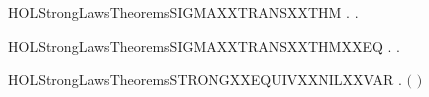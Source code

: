 \begin{SaveVerbatim}{HOLStrongLawsTheoremsSIGMAXXTRANSXXTHM}
\HOLTokenTurnstile{} \HOLSymConst{\HOLTokenForall{}}   .    \HOLTokenTransBegin{}\HOLTokenTransEnd {} \HOLSymConst{\HOLTokenImp{}} \HOLSymConst{\HOLTokenExists{}}.  \HOLSymConst{\HOLTokenLeq{}}  \HOLSymConst{\HOLTokenConj{}}   \HOLTokenTransBegin{}\HOLTokenTransEnd {}
\end{SaveVerbatim}
\newcommand{\HOLStrongLawsTheoremsSIGMAXXTRANSXXTHM}{\UseVerbatim{HOLStrongLawsTheoremsSIGMAXXTRANSXXTHM}}
\begin{SaveVerbatim}{HOLStrongLawsTheoremsSIGMAXXTRANSXXTHMXXEQ}
\HOLTokenTurnstile{} \HOLSymConst{\HOLTokenForall{}}   .    \HOLTokenTransBegin{}\HOLTokenTransEnd {} \HOLSymConst{\HOLTokenEquiv{}} \HOLSymConst{\HOLTokenExists{}}.  \HOLSymConst{\HOLTokenLeq{}}  \HOLSymConst{\HOLTokenConj{}}   \HOLTokenTransBegin{}\HOLTokenTransEnd {}
\end{SaveVerbatim}
\newcommand{\HOLStrongLawsTheoremsSIGMAXXTRANSXXTHMXXEQ}{\UseVerbatim{HOLStrongLawsTheoremsSIGMAXXTRANSXXTHMXXEQ}}
\begin{SaveVerbatim}{HOLStrongLawsTheoremsSTRONGXXEQUIVXXNILXXVAR}
\HOLTokenTurnstile{} \HOLSymConst{\HOLTokenForall{}}.   \ensuremath{(} \ensuremath{)}
\end{SaveVerbatim}
\newcommand{\HOLStrongLawsTheoremsSTRONGXXEQUIVXXNILXXVAR}{\UseVerbatim{HOLStrongLawsTheoremsSTRONGXXEQUIVXXNILXXVAR}}
